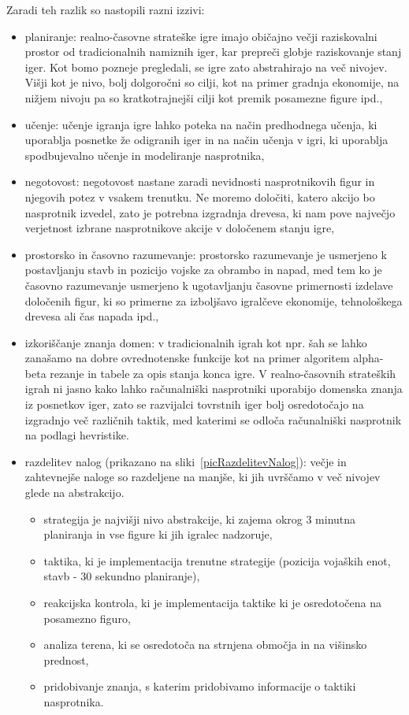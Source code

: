 \documentclass[a4paper, 12pt]{book}
\begin{document}
Zaradi teh razlik so nastopili razni izzivi:
\begin{itemize}
	\item planiranje: realno-časovne strateške igre imajo običajno večji raziskovalni prostor od tradicionalnih namiznih iger, kar prepreči globje raziskovanje stanj iger. 
	Kot bomo pozneje pregledali, se igre zato abstrahirajo na več nivojev.
	Višji kot je nivo, bolj dolgoročni so cilji, kot na primer gradnja ekonomije, na nižjem nivoju pa so kratkotrajnejši cilji kot premik posamezne figure ipd.,
	\item učenje: učenje igranja igre lahko poteka na način predhodnega učenja, ki uporablja posnetke že odigranih iger in na način učenja v igri, ki uporablja spodbujevalno učenje in modeliranje nasprotnika,
	\item negotovost: negotovost nastane zaradi nevidnosti nasprotnikovih figur in njegovih potez v vsakem trenutku. 
	Ne moremo določiti, katero akcijo bo nasprotnik izvedel, zato je potrebna izgradnja drevesa, ki nam pove največjo verjetnost izbrane nasprotnikove akcije v določenem stanju igre,
	\item prostorsko in časovno razumevanje: prostorsko razumevanje je usmerjeno k postavljanju stavb in pozicijo vojske za obrambo in napad, med tem ko je časovno razumevanje usmerjeno k ugotavljanju časovne primernosti izdelave določenih figur, ki so primerne za izboljšavo igralčeve ekonomije, tehnološkega drevesa ali čas napada ipd.,
	\item izkoriščanje znanja domen: v tradicionalnih igrah kot npr. šah se lahko zanašamo na dobre ovrednotenske funkcije kot na primer algoritem alpha-beta rezanje in tabele za opis stanja konca igre.
	V realno-časovnih strateških igrah ni jasno kako lahko računalniški nasprotniki uporabijo domenska znanja iz posnetkov iger, zato se razvijalci tovrstnih iger bolj osredotočajo na izgradnjo več različnih taktik, med katerimi se odloča računalniški nasprotnik na podlagi hevristike.
	\item razdelitev nalog (prikazano na sliki~\ref{picRazdelitevNalog}): večje in zahtevnejše naloge so razdeljene na manjše, ki jih uvrščamo v več nivojev glede na abstrakcijo.
	\begin{itemize}
		\item strategija je najvišji nivo abstrakcije, ki zajema okrog 3 minutna planiranja in vse figure ki jih igralec nadzoruje, 
		\item taktika, ki je implementacija trenutne strategije (pozicija vojaških enot, stavb - 30 sekundno planiranje),
		\item reakcijska kontrola, ki je implementacija taktike ki je osredotočena na posamezno figuro,
		\item analiza terena, ki se osredotoča na strnjena območja in na višinsko prednost,
		\item pridobivanje znanja, s katerim pridobivamo informacije o taktiki nasprotnika.
	\end{itemize}


\end{itemize}
\end{document}
